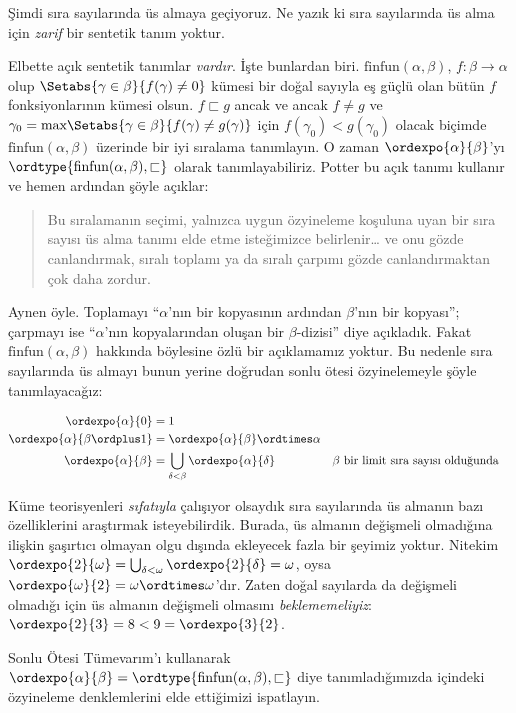 \documentclass[../../../include/open-logic-section]{subfiles}
\begin{document}

Şimdi sıra sayılarında üs almaya geçiyoruz. Ne yazık ki sıra sayılarında üs
alma için \emph{zarif} bir sentetik tanım yoktur.

Elbette açık sentetik tanımlar \emph{vardır}. İşte bunlardan biri.
$\text{finfun}(\alpha,\beta)$, $f\colon\beta\to\alpha$ olup
$\Setabs{\gamma\in\beta}{f(\gamma)\neq 0}$ kümesi bir doğal sayıyla eş
güçlü olan bütün $f$ fonksiyonlarının kümesi olsun. $f\sqsubset g$ ancak ve
ancak $f\neq g$ ve
$\gamma_0=\text{max}\Setabs{\gamma\in\beta}{f(\gamma)\neq g(\gamma)}$
için $f(\gamma_0)<g(\gamma_0)$ olacak biçimde
$\text{finfun}(\alpha,\beta)$ üzerinde bir iyi sıralama tanımlayın. O zaman
$\ordexpo{\alpha}{\beta}$'yı
$\ordtype{\text{finfun}(\alpha,\beta),\sqsubset}$ olarak tanımlayabiliriz.
Potter bu açık tanımı kullanır ve hemen ardından şöyle açıklar:
\begin{quote}
	Bu sıralamanın seçimi, yalnızca uygun özyineleme koşuluna uyan bir sıra
	sayısı üs alma tanımı elde etme isteğimizce belirlenir\ldots{} ve onu
	gözde canlandırmak, sıralı toplamı ya da sıralı çarpımı
	gözde canlandırmaktan çok daha zordur.
	\citep[p.~199]{Potter2004}
\end{quote}
Aynen öyle. Toplamayı ``$\alpha$'nın bir kopyasının ardından $\beta$'nın
bir kopyası''; çarpmayı ise ``$\alpha$'nın kopyalarından oluşan bir
$\beta$-dizisi'' diye açıkladık. Fakat
$\text{finfun}(\alpha,\beta)$ hakkında böylesine özlü bir açıklamamız
yoktur. Bu nedenle sıra sayılarında üs almayı bunun yerine doğrudan
sonlu ötesi özyinelemeyle şöyle tanımlayacağız:

\begin{defn}
\begin{align*}
	\ordexpo{\alpha}{0} &= 1\\
	\ordexpo{\alpha}{\beta\ordplus 1} &=\ordexpo{\alpha}{\beta} \ordtimes \alpha\\
	\ordexpo{\alpha}{\beta} &= \bigcup_{\delta < \beta}\ordexpo{\alpha}{\delta}& & \text{$\beta$ bir limit sıra sayısı olduğunda}
\end{align*}
\end{defn}

Küme teorisyenleri \emph{sıfatıyla} çalışıyor olsaydık sıra sayılarında üs
almanın bazı özelliklerini araştırmak isteyebilirdik. Burada, üs almanın
değişmeli olmadığına ilişkin şaşırtıcı olmayan olgu dışında ekleyecek fazla
bir şeyimiz yoktur. Nitekim
$\ordexpo{2}{\omega}=\bigcup_{\delta<\omega}\ordexpo{2}{\delta}=\omega$,
oysa $\ordexpo{\omega}{2}=\omega\ordtimes\omega$'dır. Zaten doğal sayılarda
da değişmeli olmadığı için üs almanın değişmeli olmasını
\emph{beklememeliyiz}: $\ordexpo{2}{3}=8<9=\ordexpo{3}{2}$.

\begin{prob}
Sonlu Ötesi Tümevarım'ı kullanarak
$\ordexpo{\alpha}{\beta}=\ordtype{\text{finfun}(\alpha,\beta),\sqsubset}$
diye tanımladığımızda
 içindeki özyineleme
denklemlerini elde ettiğimizi ispatlayın.
\end{prob}
\end{document}
